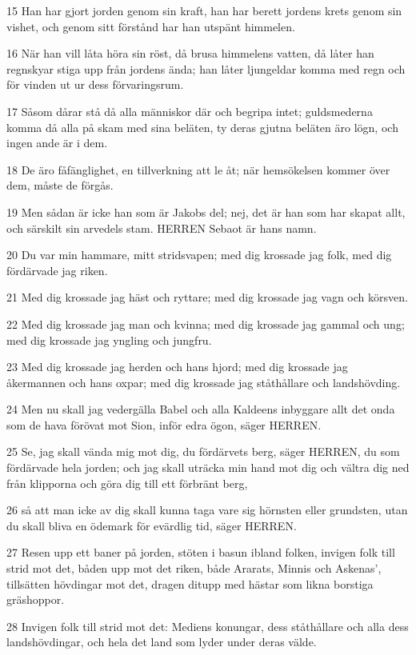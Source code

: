 \par 15 Han har gjort jorden genom sin kraft, han har berett jordens krets genom sin vishet, och genom sitt förstånd har han utspänt himmelen.
\par 16 När han vill låta höra sin röst, då brusa himmelens vatten, då låter han regnskyar stiga upp från jordens ända; han låter ljungeldar komma med regn och för vinden ut ur dess förvaringsrum.
\par 17 Såsom dårar stå då alla människor där och begripa intet; guldsmederna komma då alla på skam med sina beläten, ty deras gjutna beläten äro lögn, och ingen ande är i dem.
\par 18 De äro fåfänglighet, en tillverkning att le åt; när hemsökelsen kommer över dem, måste de förgås.
\par 19 Men sådan är icke han som är Jakobs del; nej, det är han som har skapat allt, och särskilt sin arvedels stam. HERREN Sebaot är hans namn.
\par 20 Du var min hammare, mitt stridsvapen; med dig krossade jag folk, med dig fördärvade jag riken.
\par 21 Med dig krossade jag häst och ryttare; med dig krossade jag vagn och körsven.
\par 22 Med dig krossade jag man och kvinna; med dig krossade jag gammal och ung; med dig krossade jag yngling och jungfru.
\par 23 Med dig krossade jag herden och hans hjord; med dig krossade jag åkermannen och hans oxpar; med dig krossade jag ståthållare och landshövding.
\par 24 Men nu skall jag vedergälla Babel och alla Kaldeens inbyggare allt det onda som de hava förövat mot Sion, inför edra ögon, säger HERREN.
\par 25 Se, jag skall vända mig mot dig, du fördärvets berg, säger HERREN, du som fördärvade hela jorden; och jag skall uträcka min hand mot dig och vältra dig ned från klipporna och göra dig till ett förbränt berg,
\par 26 så att man icke av dig skall kunna taga vare sig hörnsten eller grundsten, utan du skall bliva en ödemark för evärdlig tid, säger HERREN.
\par 27 Resen upp ett baner på jorden, stöten i basun ibland folken, invigen folk till strid mot det, båden upp mot det riken, både Ararats, Minnis och Askenas', tillsätten hövdingar mot det, dragen ditupp med hästar som likna borstiga gräshoppor.
\par 28 Invigen folk till strid mot det: Mediens konungar, dess ståthållare och alla dess landshövdingar, och hela det land som lyder under deras välde.
